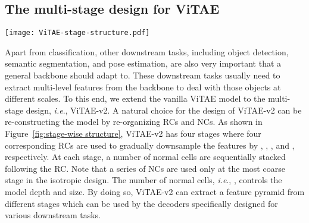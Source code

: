 \documentclass[twocolumn]{svjour3}          \smartqed  \usepackage{natbib}
\newcommand{\ie}{i.e}
\def\onedot{.\xspace}
\def\ie{\emph{i.e}\onedot}
\begin{document}
\subsection{The multi-stage design for ViTAE}

\begin{figure*}[ht]
    \centering
    \texttt{[image: ViTAE-stage-structure.pdf]}
    \caption{The structure of the proposed ViTAEv2 in the multi-stage manner. The RCs and NCs are re-arranged in a stage-wise manner. At each stage, a number of NCs are sequentially stacked following each RC, which gradually downsamples the features by a certain ratio, \ie, 4, 2, 2, and 2, respectively.}
    \label{fig:stage-wise structure}
\end{figure*}

Apart from classification, other downstream tasks, including object detection, semantic segmentation, and pose estimation, are also very important that a general backbone should adapt to. These downstream tasks usually need to extract multi-level features from the backbone to deal with those objects at different scales. To this end, we extend the vanilla ViTAE model to the multi-stage design, \ie, ViTAE-v2. A natural choice for the design of ViTAE-v2 can be re-constructing the model by re-organizing RCs and NCs. As shown in Figure~\ref{fig:stage-wise structure}, ViTAE-v2 has four stages where four corresponding RCs are used to gradually downsample the features by , , , and , respectively. At each stage, a number of  normal cells are sequentially stacked following the  RC. Note that a series of NCs are used only at the most coarse stage in the isotropic design. The number of normal cells, \ie, , controls the model depth and size. By doing so, ViTAE-v2 can extract a feature pyramid from different stages which can be used by the decoders specifically designed for various downstream tasks.
\end{document}
